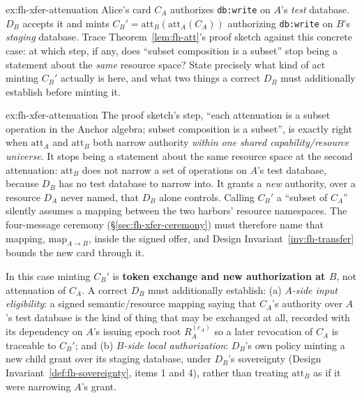 \documentclass[11pt,a4paper]{article}
\theoremstyle{definition}
\theoremstyle{remark}
\begin{document}
\begin{pdexercise}[kind=Trace,rating=2]{ex:fh-xfer-attenuation}
Alice's card $C_A$ authorizes \texttt{db:write} on $A$'s \emph{test} database. $D_B$ accepts it and mints $C_B' = \mathrm{att}_B(\mathrm{att}_A(C_A))$ authorizing \texttt{db:write} on $B$'s \emph{staging} database. Trace Theorem~\ref{lem:fh-att}'s proof sketch against this concrete case: at which step, if any, does ``subset composition is a subset'' stop being a statement about the \emph{same} resource space? State precisely what kind of act minting $C_B'$ actually is here, and what two things a correct $D_B$ must additionally establish before minting it.
\end{pdexercise}
\begin{pdsolution}{ex:fh-xfer-attenuation}
The proof sketch's step, ``each attenuation is a subset operation in the Anchor algebra; subset composition is a subset'', is exactly right when $\mathrm{att}_A$ and $\mathrm{att}_B$ both narrow authority \emph{within one shared capability/resource universe}. It stops being a statement about the same resource space at the second attenuation: $\mathrm{att}_B$ does not narrow a set of operations on $A$'s test database, because $D_B$ has no test database to narrow into. It grants a \emph{new} authority, over a resource $D_A$ never named, that $D_B$ alone controls. Calling $C_B'$ a ``subset of $C_A$'' silently assumes a mapping between the two harbors' resource namespaces. The four-message ceremony (\S\ref{sec:fh-xfer-ceremony}) must therefore name that mapping, $\mathrm{map}_{A\to B}$, inside the signed offer, and Design Invariant~\ref{inv:fh-transfer} bounds the new card through it.

In this case minting $C_B'$ is \textbf{token exchange and new authorization at $B$}, not attenuation of $C_A$. A correct $D_B$ must additionally establish: (a) \emph{$A$-side input eligibility}: a signed semantic/resource mapping saying that $C_A$'s authority over $A$'s test database is the kind of thing that may be exchanged at all, recorded with its dependency on $A$'s issuing epoch root $R_A^{(e_A)}$ so a later revocation of $C_A$ is traceable to $C_B'$; and (b) \emph{$B$-side local authorization}: $D_B$'s own policy minting a new child grant over its staging database, under $D_B$'s sovereignty (Design Invariant~\ref{def:fh-sovereignty}, items 1 and 4), rather than treating $\mathrm{att}_B$ as if it were narrowing $A$'s grant.


\end{pdsolution}
\end{document}
